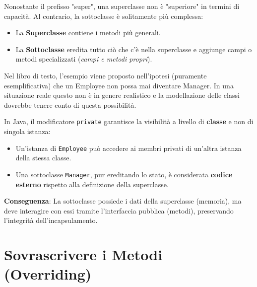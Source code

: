 Nonostante il prefisso "super", una superclasse non è "superiore" in termini di capacità. Al contrario, la sottoclasse è solitamente più complessa:
\begin{itemize}
    \item La \textbf{Superclasse} contiene i metodi più generali.
    \item La \textbf{Sottoclasse} eredita tutto ciò che c'è nella superclasse e aggiunge campi o metodi specializzati (\textit{campi e metodi propri}).
\end{itemize}

\begin{warningbox}
    Nel libro di testo, l'esempio viene proposto nell'ipotesi (puramente esemplificativa) che un Employee non possa mai diventare Manager. In una situazione reale questo non è in genere realistico e la modellazione delle classi dovrebbe tenere conto di questa possibilità.
\end{warningbox}

\begin{tip}
    In Java, il modificatore \texttt{private} garantisce la visibilità a livello di \textbf{classe} e non di singola istanza:
    \begin{itemize}
        \item Un'istanza di \texttt{Employee} può accedere ai membri privati di un'altra istanza della stessa classe.
        \item Una sottoclasse \texttt{Manager}, pur ereditando lo stato, è considerata \textbf{codice esterno} rispetto alla definizione della superclasse.
    \end{itemize}
    \textbf{Conseguenza}: La sottoclasse possiede i dati della superclasse (memoria), ma deve interagire con essi tramite l'interfaccia pubblica (metodi), preservando l'integrità dell'incapsulamento.
\end{tip}

\section{Sovrascrivere i Metodi (Overriding)}

